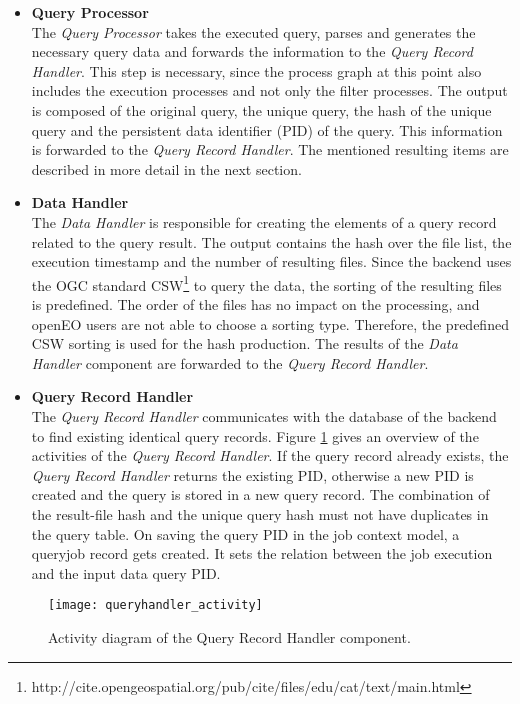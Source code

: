 \documentclass[draft,final]{vutinfth} %
\begin{document}
 \begin{itemize}
	\item \textbf{Query Processor} \\
	The \textit{Query Processor} takes the executed query, parses and generates the necessary query data and forwards the information to the \textit{Query Record Handler}. This step is necessary, since the process graph at this point also includes the execution processes and not only the filter processes. The output is composed of the original query, the unique query, the hash of the unique query and the persistent data identifier (PID) of the query. This information is forwarded to the \textit{Query Record Handler}. The mentioned resulting items are described in more detail in the next section.
	\newpage   
	\item \textbf{Data Handler} \\ 
	The \textit{Data Handler} is responsible for creating the elements of a query record related to the query result. The output contains the hash over the file list, the execution timestamp and the number of resulting files. Since the backend uses the OGC standard CSW\footnote{http://cite.opengeospatial.org/pub/cite/files/edu/cat/text/main.html} to query the data, the sorting of the resulting files is predefined. The order of the files has no impact on the processing, and openEO users are not able to choose a sorting type. Therefore, the predefined CSW sorting is used for the hash production. The results of the \textit{Data Handler} component are forwarded to the \textit{Query Record Handler}.    
	\item \textbf{Query Record Handler} \\
	The \textit{Query Record Handler} communicates with the database of the backend to find existing identical query records. Figure \ref{fig:queryhandler_activity} gives an overview of the activities of the \textit{Query Record Handler}. If the query record already exists, the \textit{Query Record Handler} returns the existing PID, otherwise a new PID is created and the query is stored in a new query record. The combination of the result-file hash and the unique query hash must not have duplicates in the query table. On saving the query PID in the job context model, a queryjob record gets created. It sets the relation between the job execution and the input data query PID. 
\end{itemize}

\begin{figure}[h]
	\centering
	\texttt{[image: queryhandler\_activity]}
	\caption{Activity diagram of the Query Record Handler component.}
	\label{fig:queryhandler_activity} %
\end{figure}
\end{document}
